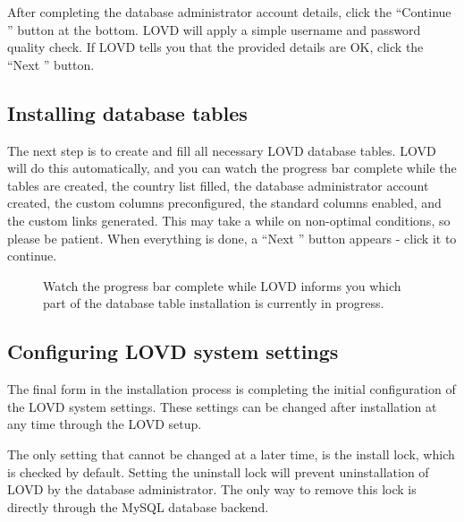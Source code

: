 \documentclass[a4paper,oneside,openany,12pt]{memoir}
\begin{document}
After completing the database administrator account details, click the ``Continue \guillemotright'' button at the bottom.
LOVD will apply a simple username and password quality check.
If LOVD tells you that the provided details are OK, click the ``Next \guillemotright'' button.



\subsection{Installing database tables}
The next step is to create and fill all necessary LOVD database tables.
LOVD will do this automatically, and you can watch the progress bar complete while the tables are created,
the country list filled, the database administrator account created, the custom columns preconfigured,
the standard columns enabled, and the custom links generated.
This may take a while on non-optimal conditions, so please be patient.
When everything is done, a ``Next \guillemotright'' button appears - click it to continue.

\begin{figure}[ht]
  \begin{shaded}
  \caption{Watch the progress bar complete while LOVD informs you which part of the database table installation is currently in progress.}
  \end{shaded}
\end{figure}



\subsection{Configuring LOVD system settings}
The final form in the installation process is completing the initial configuration of the LOVD system settings.
These settings can be changed after installation at any time through the LOVD setup.

The only setting that cannot be changed at a later time, is the install lock, which is checked by default.
Setting the uninstall lock will prevent uninstallation of LOVD by the database administrator.
The only way to remove this lock is directly through the MySQL database backend.
\end{document}
